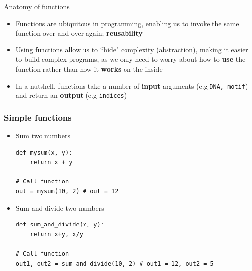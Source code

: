 \documentclass[xcolor=table]{beamer}
\begin{document}
\begin{frame}{Anatomy of functions}

\begin{itemize}\addtolength{\itemsep}{0.5\baselineskip}
	\item<1-> Functions are ubiquitous in programming, enabling us to invoke the same
	function over and over again; \textbf{reusability}

	\item<2-> Using functions allow us to ``hide" complexity (abstraction), 
	making it easier to build complex programs, as we only need to 
	worry about how to \textbf{use} the function rather than how it \textbf{works}
	on the inside

	\item<3-> In a nutshell, functions take a number of \textbf{input} arguments
	(e.g \texttt{DNA, motif}) and return an \textbf{output} (e.g \texttt{indices})
\end{itemize}
\vfill
\begin{center}
\end{center}

\end{frame}

\begin{frame}[fragile]
\frametitle{Simple functions}

\begin{itemize}[leftmargin=*]
\item<1->Sum two numbers
\begin{lstlisting}[style=python]
def mysum(x, y):
    return x + y

# Call function
out = mysum(10, 2) # out = 12
\end{lstlisting}

\item<2->Sum and divide two numbers
\begin{lstlisting}[style=python]
def sum_and_divide(x, y):
    return x+y, x/y

# Call function
out1, out2 = sum_and_divide(10, 2) # out1 = 12, out2 = 5
\end{lstlisting}

\end{itemize}
\end{frame}
\end{document}
